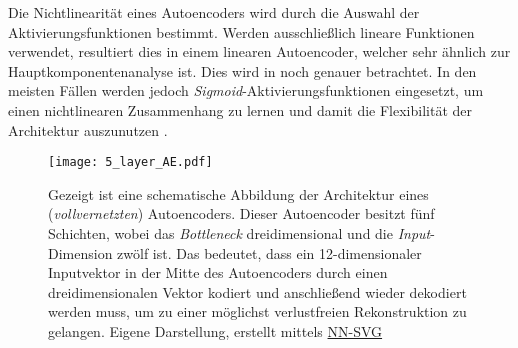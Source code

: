 Die Nichtlinearität eines Autoencoders wird durch die Auswahl der Aktivierungsfunktionen bestimmt.
Werden ausschließlich lineare Funktionen verwendet, resultiert dies in einem linearen Autoencoder,
welcher sehr ähnlich zur Hauptkomponentenanalyse ist. Dies wird in
 noch genauer betrachtet. In den meisten
Fällen werden jedoch \textit{Sigmoid}-Aktivierungsfunktionen eingesetzt, um einen nichtlinearen
Zusammenhang zu lernen und damit die Flexibilität der Architektur auszunutzen \parencite[4]{Charte.2018}.

\begin{figure}[h]
	\label{fig:5-layer-Autoencoder}
	\begin{center}
		\texttt{[image: 5\_layer\_AE.pdf]}
		\caption[Schematische Abbildung der Architektur eines Autoencoders]{Gezeigt ist eine schematische Abbildung der Architektur eines (\textit{vollvernetzten}) Autoencoders. Dieser Autoencoder besitzt fünf Schichten, wobei das \textit{Bottleneck} dreidimensional und die \textit{Input}-Dimension zwölf ist. Das bedeutet, dass ein 12-dimensionaler Inputvektor in der Mitte des Autoencoders durch einen dreidimensionalen Vektor kodiert und anschließend wieder dekodiert werden muss, um zu einer möglichst verlustfreien Rekonstruktion zu gelangen. Eigene Darstellung, erstellt mittels \href{https://alexlenail.me/NN-SVG/}{NN-SVG}}
	\end{center}
\end{figure}

